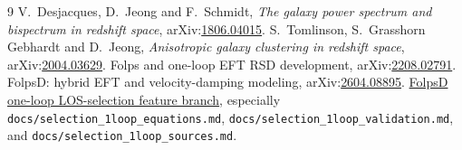 \documentclass[11pt,a4paper]{article}
\begin{document}
\begin{thebibliography}{9}
 V.~Desjacques, D.~Jeong and F.~Schmidt, \emph{The galaxy power spectrum and bispectrum in redshift space}, arXiv:\href{https://arxiv.org/abs/1806.04015}{1806.04015}.
 S.~Tomlinson, S.~Grasshorn Gebhardt and D.~Jeong, \emph{Anisotropic galaxy clustering in redshift space}, arXiv:\href{https://arxiv.org/abs/2004.03629}{2004.03629}.
 Folps and one-loop EFT RSD development, arXiv:\href{https://arxiv.org/abs/2208.02791}{2208.02791}.
 FolpsD: hybrid EFT and velocity-damping modeling, arXiv:\href{https://arxiv.org/abs/2604.08895}{2604.08895}.
 \href{https://github.com/cosmodesi/FolpsD/tree/feature/selection-1loop-eds}{FolpsD one-loop LOS-selection feature branch}, especially \texttt{docs/selection\_1loop\_equations.md}, \texttt{docs/selection\_1loop\_validation.md}, and \texttt{docs/selection\_1loop\_sources.md}.
\end{thebibliography}
\end{document}
